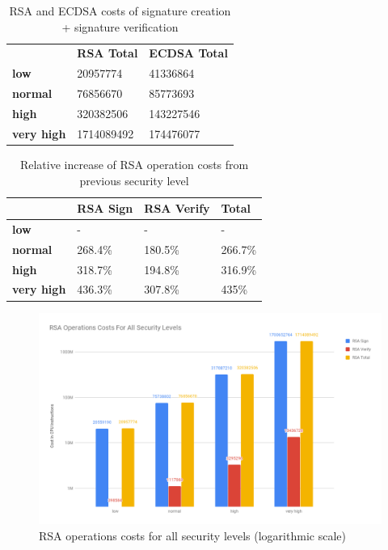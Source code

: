\documentclass{llncs}
\begin{document}
\begin{table}[]
  \begin{tabular}{lll}
                     & \textbf{RSA Total} & \textbf{ECDSA Total} \\
  \textbf{low}       & 20957774           & 41336864             \\
  \textbf{normal}    & 76856670           & 85773693             \\
  \textbf{high}      & 320382506          & 143227546            \\
  \textbf{very high} & 1714089492         & 174476077           
  \end{tabular}
  \caption{\label{table:rsa-costs-all-sls-total} RSA and ECDSA costs of signature creation + signature verification}
\end{table}

\begin{table}[]
\label{table:rsa-pub-priv-cost-increase}
\begin{tabular}{|l|l|l|l|}
  \hline
& \textbf{RSA Sign} & \textbf{RSA Verify} & \textbf{Total} \\ \hline
\textbf{low}       & -                 & -                   & -              \\ \hline
\textbf{normal}    & 268.4\%           & 180.5\%             & 266.7\%        \\ \hline
\textbf{high}      & 318.7\%           & 194.8\%             & 316.9\%        \\ \hline
\textbf{very high} & 436.3\%           & 307.8\%             & 435\%          \\ \hline
\end{tabular}
\caption{Relative increase of RSA operation costs from previous security level}
\end{table}

\begin{figure}
  \centering
  \includegraphics[width=1.0\textwidth]{img/rsa_cost_all_sls.png}
  \caption{\label{fig:rsa-costs-all-sls} RSA operations costs for all security levels (logarithmic scale)}
\end{figure}
\end{document}
